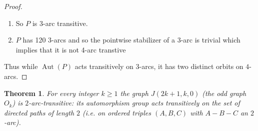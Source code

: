 \documentclass[12pt,a4paper,openany]{book}
\newtheorem{theorem}{Theorem}[section]
\begin{document}
\begin{proof}
\begin{enumerate}
    
    

    \item So $P$ is 3-arc transitive.
    
    \item $P$ has 120 3-arcs and so the pointwise stabilizer of a $3$-arc is trivial which implies that it is not 4-arc transtive
    
\end{enumerate}



Thus while $\operatorname{Aut}(P)$ acts transitively on $3$-arcs, it has two distinct orbits on $4$-arcs.
\end{proof}








\begin{theorem}
For every integer $k\ge 1$ the graph $J(2k+1,k,0)$ (the odd graph $O_k$)
is $2$-arc-transitive: its automorphism group acts transitively on the
set of directed paths of length $2$ (i.e. on ordered triples
$(A,B,C)$ with $A\!-\!B\!-\!C$ an $2$-arc).
\end{theorem}
\end{document}

